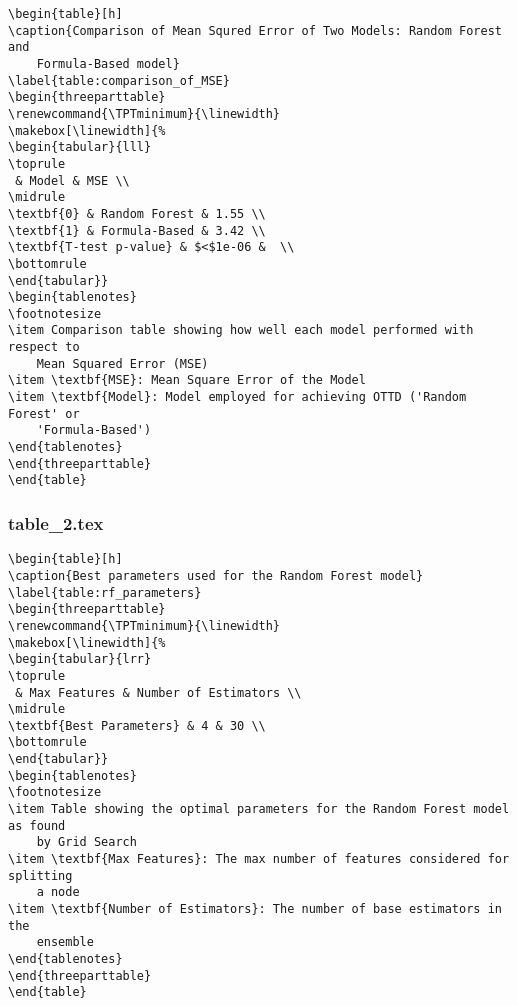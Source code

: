 \documentclass[11pt]{article}
\begin{document}
\begin{Verbatim}[tabsize=4]
\begin{table}[h]
\caption{Comparison of Mean Squred Error of Two Models: Random Forest and
	Formula-Based model}
\label{table:comparison_of_MSE}
\begin{threeparttable}
\renewcommand{\TPTminimum}{\linewidth}
\makebox[\linewidth]{%
\begin{tabular}{lll}
\toprule
 & Model & MSE \\
\midrule
\textbf{0} & Random Forest & 1.55 \\
\textbf{1} & Formula-Based & 3.42 \\
\textbf{T-test p-value} & $<$1e-06 &  \\
\bottomrule
\end{tabular}}
\begin{tablenotes}
\footnotesize
\item Comparison table showing how well each model performed with respect to
	Mean Squared Error (MSE)
\item \textbf{MSE}: Mean Square Error of the Model
\item \textbf{Model}: Model employed for achieving OTTD ('Random Forest' or
	'Formula-Based')
\end{tablenotes}
\end{threeparttable}
\end{table}

\end{Verbatim}

\subsubsection*{table\_2.tex}

\begin{Verbatim}[tabsize=4]
\begin{table}[h]
\caption{Best parameters used for the Random Forest model}
\label{table:rf_parameters}
\begin{threeparttable}
\renewcommand{\TPTminimum}{\linewidth}
\makebox[\linewidth]{%
\begin{tabular}{lrr}
\toprule
 & Max Features & Number of Estimators \\
\midrule
\textbf{Best Parameters} & 4 & 30 \\
\bottomrule
\end{tabular}}
\begin{tablenotes}
\footnotesize
\item Table showing the optimal parameters for the Random Forest model as found
	by Grid Search
\item \textbf{Max Features}: The max number of features considered for splitting
	a node
\item \textbf{Number of Estimators}: The number of base estimators in the
	ensemble
\end{tablenotes}
\end{threeparttable}
\end{table}

\end{Verbatim}
\end{document}
